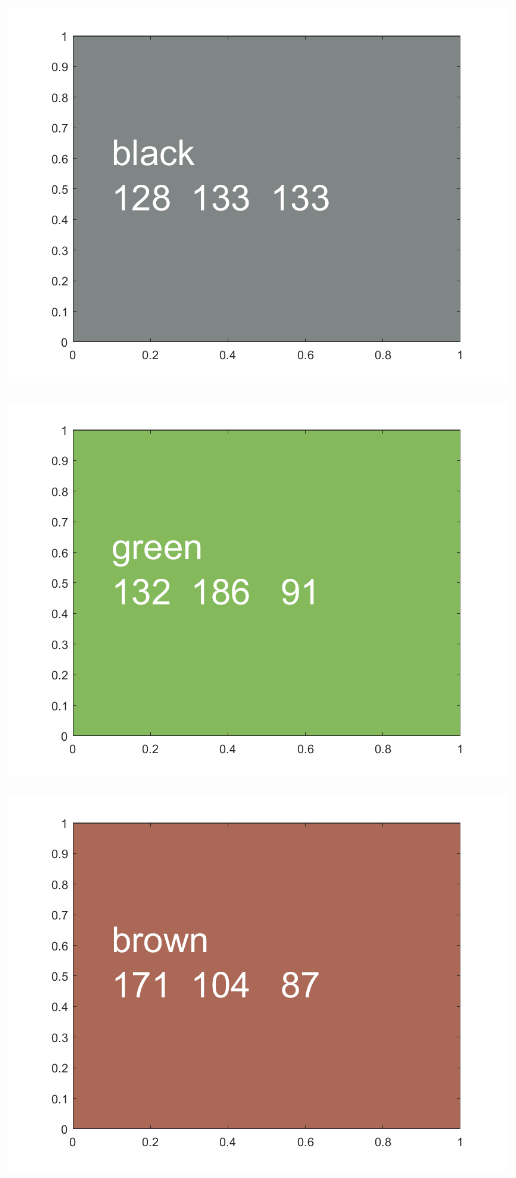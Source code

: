 \documentclass[
]{book}
\begin{document}
\includegraphics[width=5.20833in,height=\textheight]{img/fs_color_images/figure_8.png}

\includegraphics[width=5.20833in,height=\textheight]{img/fs_color_images/figure_9.png}

\includegraphics[width=5.20833in,height=\textheight]{img/fs_color_images/figure_10.png}
\end{document}
